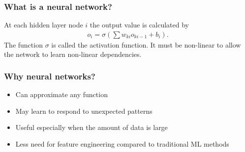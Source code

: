 \documentclass{beamer}
\begin{document}
  \begin{frame}
    \frametitle{What is a neural network?}  
    At each hidden layer node $i$ the output value is calculated by 
	\begin{align*}
    o_{i} = \sigma(\sum{w_{ki}o_{ki-1}} + b_{i}). 
    \end{align*}
    The function $\sigma$ is called the activation function. It must be non-linear to allow the network to learn non-linear dependencies.
  \end{frame} 
  \begin{frame}
    \frametitle{Why neural networks?}  
    
   	\begin{itemize}
		\item Can approximate any function \cite{hornik}
		\item May learn to respond to unexpected patterns
		\item Useful especially when the amount of data is large
		\item Less need for feature engineering compared to traditional ML methods
	\end{itemize}
  \end{frame}
  
\end{document}

